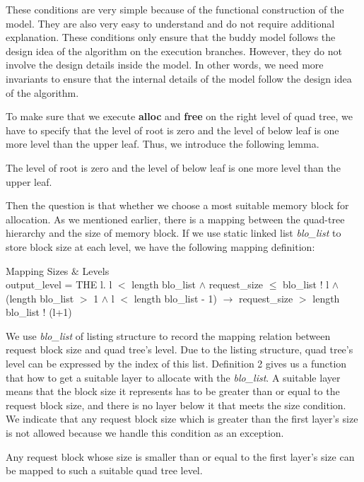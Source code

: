 \documentclass[runningheads]{llncs}
\begin{document}
These conditions are very simple because of the functional construction of the model. They are also very easy to understand and do not require additional explanation. These conditions only ensure that the buddy model follows the design idea of the algorithm on the execution branches. However, they do not involve the design details inside the model. In other words, we need more invariants to ensure that the internal details of the model follow the design idea of the algorithm.

To make sure that we execute \textbf{alloc} and \textbf{free} on the right level of quad tree, we have to specify that the level of root is zero and the level of below leaf is one more level than the upper leaf. Thus, we introduce the following lemma.

\begin{lemma}
	The level of root is zero and the level of below leaf is one more level than the upper leaf.
\end{lemma}

Then the question is that whether we choose a most suitable memory block for allocation. As we mentioned earlier, there is a mapping between the quad-tree hierarchy and the size of memory block. If we use static linked list \textsl{blo\_list} to store block size at each level, we have the following mapping definition:

\begin{definition} {Mapping Sizes $\&$ Levels} \\
output\_level = THE l. l $<$ length blo\_list $\wedge$ request\_size $\le$ blo\_list ! l $\wedge$ (length blo\_list $>$ 1 $\wedge$ l $<$ length blo\_list - 1) $\longrightarrow$ request\_size $>$ length blo\_list ! (l+1)
\end{definition}

We use \textsl{blo\_list} of listing structure to record the mapping relation between request block size and quad tree's level. Due to the listing structure, quad tree's level can be expressed by the index of this list. Definition 2 gives us a function that how to get a suitable layer to allocate with the \textsl{blo\_list}. A suitable layer means that the block size it represents has to be greater than or equal to the request block size, and there is no layer below it that meets the size condition. We indicate that any request block size which is greater than the first layer's size is not allowed because we handle this condition as an exception.

\begin{theorem}
Any request block whose size is smaller than or equal to the first layer's size can be mapped to such a suitable quad tree level.
\end{theorem}
\end{document}
